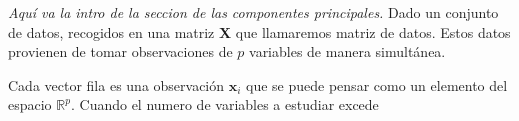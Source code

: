 
\textit{Aquí va la intro de la seccion de las componentes principales.}
\noindent Dado un conjunto de datos, recogidos en una matriz \textbf{X} que llamaremos matriz de datos. Estos datos provienen de tomar observaciones de $p$ variables de manera simultánea. 

\noindent Cada vector fila es una observación $\textbf{x}_i$ que se puede pensar como un elemento del espacio $\mathbb{R}^p$. Cuando el numero de variables a estudiar excede 



%
%
%
%
%
%
%

